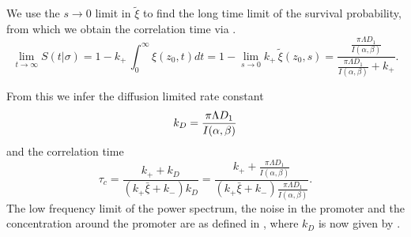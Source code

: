 We use the $s \rightarrow 0$ limit in $\tilde{\xi}$ to find the long time limit of the survival probability, from which we  obtain the correlation time via . 
\begin{equation}
  \lim_{t \rightarrow \infty}S(t|\sigma) = 1 - k_+ \, \int_0^{\infty} \xi(z_0, t) dt = 1 - \lim_{s \rightarrow 0} k_+ \, \tilde{\xi}(z_0, s) = \frac{\frac{\pi \Lambda D_1}{I(\alpha,\beta)}}{\frac{\pi \Lambda D_1}{I(\alpha,\beta)} + k_+}.
\end{equation}

From this we infer the diffusion limited rate constant
\begin{equation}
 k_D = \frac{\pi \Lambda D_1}{I(\alpha,\beta)}
 \elabel{kDFullJ}
\end{equation}
and the correlation time
\begin{equation}
 \tau_c = \frac{k_+ + k_D}{(k_+ \bar{\xi} + k_-) k_D} = \frac{k_+ + \frac{\pi \Lambda D_1}{I(\alpha,\beta)}}{(k_+ \bar{\xi} + k_-) \frac{\pi \Lambda D_1}{I(\alpha,\beta)}}.
\end{equation}
The low frequency limit of the power spectrum, the noise in the promoter and the concentration around the promoter are as defined in , where $k_D$ is now given by .


